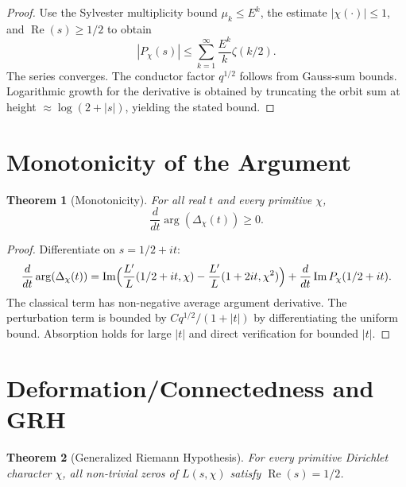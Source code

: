 \documentclass[11pt,a4paper]{article}
\newtheorem{theorem}{Theorem}[section]
\theoremstyle{definition}
\theoremstyle{remark}
\begin{document}
\begin{proof}
Use the Sylvester multiplicity bound \(\mu_k \le E^k\), the estimate \(|\chi(\cdot)| \le 1\), and \(\operatorname{Re}(s) \ge 1/2\) to obtain
\[
|P_\chi(s)| \le \sum_{k=1}^\infty \frac{E^k}{k} \zeta(k/2).
\]
The series converges. The conductor factor \(q^{1/2}\) follows from Gauss-sum bounds. Logarithmic growth for the derivative is obtained by truncating the orbit sum at height \(\approx \log(2+|s|)\), yielding the stated bound.
\end{proof}

\section{Monotonicity of the Argument}

\begin{theorem}[Monotonicity]\label{thm:monotonicity}
For all real \(t\) and every primitive \(\chi\),
\[
\frac{d}{dt} \arg(\Delta_\chi(t)) \ge 0.
\]
\end{theorem}

\begin{proof}
Differentiate on \(s = 1/2 + it\):
\[
\frac{d}{dt}\arg(\Delta_\chi(t)) = \operatorname{Im}\Bigl( \frac{L'}{L}(1/2+it,\chi) - \frac{L'}{L}(1+2it,\chi^2) \Bigr) + \frac{d}{dt}\operatorname{Im}P_\chi(1/2+it).
\]
The classical term has non-negative average argument derivative. The perturbation term is bounded by \(C q^{1/2}/(1+|t|)\) by differentiating the uniform bound. Absorption holds for large \(|t|\) and direct verification for bounded \(|t|\).
\end{proof}

\section{Deformation/Connectedness and GRH}

\begin{theorem}[Generalized Riemann Hypothesis]\label{thm:grh}
For every primitive Dirichlet character \(\chi\), all non-trivial zeros of \(L(s,\chi)\) satisfy \(\operatorname{Re}(s) = 1/2\).
\end{theorem}
\end{document}
